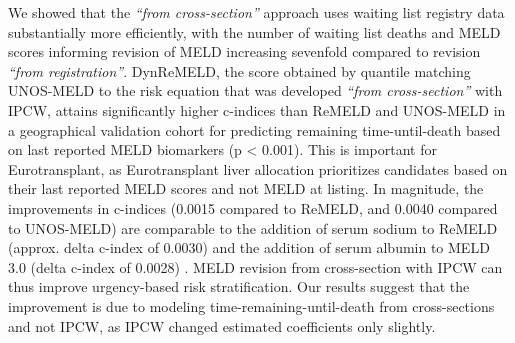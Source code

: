 \documentclass[11pt,twoside,]{book}
\begin{document}
We showed that the \emph{``from cross-section''} approach uses waiting list
registry data substantially more efficiently, with the number of
waiting list deaths and MELD scores informing revision of MELD increasing
sevenfold compared to revision \emph{``from registration''}. DynReMELD, the
score obtained by quantile matching UNOS-MELD to the risk equation that
was developed \emph{``from cross-section''} with IPCW, attains significantly higher
c-indices than ReMELD and UNOS-MELD in a geographical validation cohort
for predicting remaining time-until-death based on last reported MELD
biomarkers (p \textless{} 0.001). This is important for Eurotransplant, as
Eurotransplant liver allocation prioritizes candidates based on their
last reported MELD scores and not MELD at listing. In magnitude,
the improvements in c-indices (0.0015 compared to ReMELD, and 0.0040
compared to UNOS-MELD) are comparable to the addition of serum sodium to
ReMELD (approx. delta c-index of 0.0030)
\citep{goudsmitRefittingModelEndstage2020} and the addition of serum albumin to
MELD 3.0 (delta c-index of 0.0028) \citep{kimMELD3point0}. MELD revision from
cross-section with IPCW can thus improve urgency-based risk
stratification. Our results suggest that the improvement is due to
modeling time-remaining-until-death from cross-sections and not IPCW,
as IPCW changed estimated coefficients only slightly.
\end{document}
